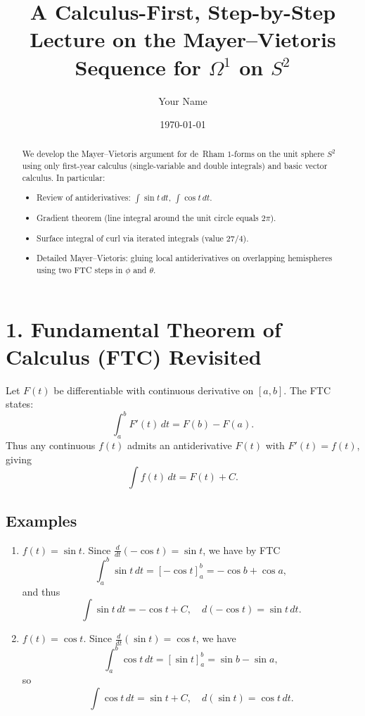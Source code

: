 \documentclass[11pt]{article}
\title{A Calculus-First, Step-by-Step Lecture on the Mayer--Vietoris Sequence for $\Omega^1$ on $S^2$}
\author{Your Name}
\date{\today}
\begin{document}
	\maketitle
	
	\begin{abstract}
		We develop the Mayer--Vietoris argument for de~Rham $1$-forms on the unit sphere $S^2$ using only first-year calculus (single-variable and double integrals) and basic vector calculus.  In particular:
		\begin{itemize}
			\item Review of antiderivatives: $\displaystyle\int\sin t\,dt$, $\displaystyle\int\cos t\,dt$.
			\item Gradient theorem (line integral around the unit circle equals $2\pi$).
			\item Surface integral of curl via iterated integrals (value $27/4$).
			\item Detailed Mayer--Vietoris: gluing local antiderivatives on overlapping hemispheres using two FTC steps in $\phi$ and $\theta$.
		\end{itemize}
	\end{abstract}
	
	\section{1. Fundamental Theorem of Calculus (FTC) Revisited}
	Let $F(t)$ be differentiable with continuous derivative on $[a,b]$.  The FTC states:
	\[
	\int_{a}^{b}F'(t)\,dt = F(b)-F(a).
	\]
	Thus any continuous $f(t)$ admits an antiderivative $F(t)$ with $F'(t)=f(t)$, giving
	\[
	\int f(t)\,dt = F(t) + C.
	\]
	
	\subsection*{Examples}
	\begin{enumerate}
		\item $f(t)=\sin t$.  Since $\frac{d}{dt}(-\cos t)=\sin t$, we have by FTC
		\[
		\int_{a}^{b}\sin t\,dt = [-\cos t]_{a}^{b} = -\cos b + \cos a,
		\]
		and thus
		\[
		\int \sin t\,dt = -\cos t + C,
		\quad d(-\cos t) = \sin t\,dt.
		\]
		\item $f(t)=\cos t$.  Since $\frac{d}{dt}(\sin t)=\cos t$, we have
		\[
		\int_{a}^{b}\cos t\,dt = [\sin t]_{a}^{b} = \sin b - \sin a,
		\]
		so
		\[
		\int \cos t\,dt = \sin t + C,
		\quad d(\sin t) = \cos t\,dt.
		\]
	\end{enumerate}
	
\end{document}
